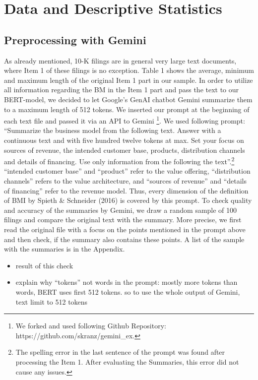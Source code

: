 \documentclass[
]{article}
\providecommand{\tightlist}{%
  \setlength{\itemsep}{0pt}\setlength{\parskip}{0pt}}\usepackage{longtable,booktabs,array}
\begin{document}
\section{Data and Descriptive
Statistics}\label{data-and-descriptive-statistics}

\subsection{Preprocessing with Gemini}\label{preprocessing-with-gemini}

As already mentioned, 10-K filings are in general very large text
documents, where Item 1 of these filings is no exception. Table 1 shows
the average, minimum and maximum length of the original Item 1 part in
our sample. In order to utilize all information regarding the BM in the
Item 1 part and pass the text to our BERT-model, we decided to let
Google's GenAI chatbot Gemini summarize them to a maximum length of 512
tokens. We inserted our prompt at the beginning of each text file and
passed it via an API to Gemini \footnote{We forked and used following
  Github Repository: https://github.com/skranz/gemini\_ex.}. We used
following prompt: ``Summarize the business model from the following
text. Answer with a continuous text and with five hundred twelve tokens
at max. Set your focus on sources of revenue, the intended customer
base, products, distribution channels and details of financing. Use only
information from the following the text''.\footnote{The spelling error
  in the last sentence of the prompt was found after processing the Item
  1. After evaluating the Summaries, this error did not cause any
  issues.} ``intended customer base'' and ``product'' refer to the value
offering, ``distribution channels'' refers to the value architecture,
and ``sources of revenue'' and ``details of financing'' refer to the
revenue model. Thus, every dimension of the definition of BMI by Spieth
\& Schneider (2016) is covered by this prompt. To check quality and
accuracy of the summaries by Gemini, we draw a random sample of 100
filings and compare the original text with the summary. More precise, we
first read the original file with a focus on the points mentioned in the
prompt above and then check, if the summary also contains these points.
A list of the sample with the summaries is in the Appendix.

\begin{itemize}
\tightlist
\item
  result of this check
\item
  explain why ``tokens'' not words in the prompt: mostly more tokens
  than words, BERT uses first 512 tokens. so to use the whole output of
  Gemini, text limit to 512 tokens
\end{itemize}
\end{document}

